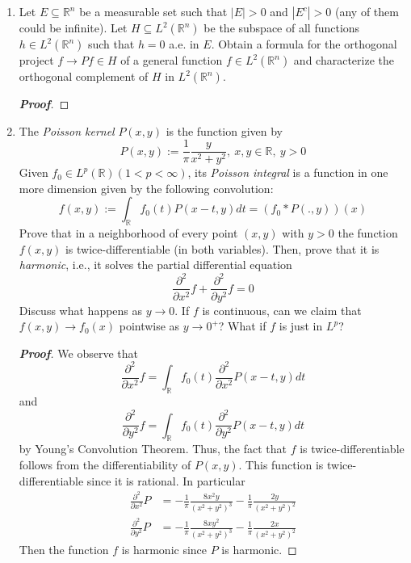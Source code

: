 \documentclass[12pt,leqno]{book}
\theoremstyle{definition}
\newcommand{\R}{\mathbb{R}}
\newenvironment{Proof}{\begin{proof}[\textnormal{\textbf{Proof}}]}{\end{proof}}
\begin{document}
\begin{enumerate}
 \item Let $E\subseteq\R^n$ be a measurable set such that $|E|>0$ and $|E^c|>0$ (any of them could be infinite). Let $H\subseteq L^2(\R^n)$ be the subspace of all functions $h\in L^2(\R^n)$ such that $h=0$ a.e. in $E$. Obtain a formula for the orthogonal project $f\to Pf\in H$ of a general function $f\in L^2(\R^n)$ and characterize the orthogonal complement of $H$ in $L^2(\R^n)$. 

\begin{Proof}
 
\end{Proof}

 \item The \textit{Poisson kernel} $P(x,y)$ is the function given by \[P(x,y):=\frac{1}{\pi}\frac{y}{x^2+y^2},\:x,y\in\R,\:y>0\] Given $f_0\in L^p(\R)(1<p<\infty)$, its \textit{Poisson integral} is a function in one more dimension given by the following convolution: \[f(x,y):=\int_{\R}f_0(t)P(x-t,y)dt=(f_0*P(.,y))(x)\] Prove that in a neighborhood of every point $(x,y)$ with $y>0$ the function $f(x,y)$ is twice-differentiable (in both variables). Then, prove that it is \textit{harmonic}, i.e., it solves the partial differential equation \[\frac{\partial^2}{\partial x^2}f+\frac{\partial^2}{\partial y^2}f=0\] Discuss what happens as $y\to0$. If $f$ is continuous, can we claim that $f(x,y)\to f_0(x)$ pointwise as $y\to0^+$? What if $f$ is just in $L^p$?

\begin{Proof}
 We observe that \[\frac{\partial^2}{\partial x^2}f=\int_{\R}f_0(t)\frac{\partial^2}{\partial x^2}P(x-t,y)dt\] and \[\frac{\partial^2}{\partial y^2}f=\int_{\R}f_0(t)\frac{\partial^2}{\partial y^2}P(x-t,y)dt\] by Young's Convolution Theorem. Thus, the fact that $f$ is twice-differentiable follows from the differentiability of $P(x,y)$. This function is twice-differentiable since it is rational. In particular \begin{align*}\frac{\partial^2}{\partial x^2}P&=-\frac{1}{\pi}\frac{8x^2y}{(x^2+y^2)^3}-\frac{1}{\pi}\frac{2y}{(x^2+y^2)^2}\\\frac{\partial^2}{\partial y^2}P&=-\frac{1}{\pi}\frac{8xy^2}{(x^2+y^2)^3}-\frac{1}{\pi}\frac{2x}{(x^2+y^2)^2}\end{align*} Then the function $f$ is harmonic since $P$ is harmonic.
\end{Proof}

\end{enumerate}
\end{document}
